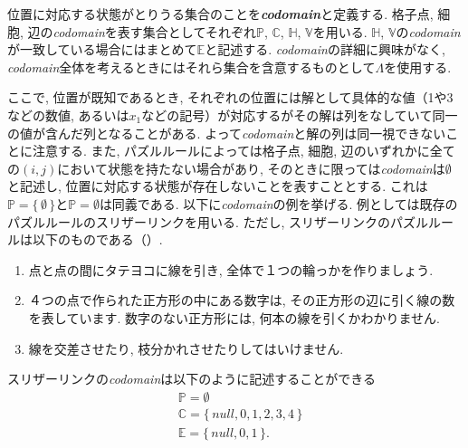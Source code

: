 \begin{definition}\label{definition:Codomain}
  位置に対応する状態がとりうる集合のことを\textbf{\textit{codomain}}と定義する. 格子点, 細胞, 辺の\textit{codomain}を表す集合としてそれぞれ$\mathbb{P}$, $\mathbb{C}$, $\mathbb{H}$, $\mathbb{V}$を用いる. $\mathbb{H}$, $\mathbb{V}$の\textit{codomain}が一致している場合にはまとめて$\mathbb{E}$と記述する. \textit{codomain}の詳細に興味がなく, \textit{codomain}全体を考えるときにはそれら集合を含意するものとして$\Lambda$を使用する.
\end{definition}

ここで, 位置が既知であるとき, それぞれの位置には解として具体的な値（1や3などの数値, あるいは$x_1$などの記号）が対応するがその解は列をなしていて同一の値が含んだ列となることがある.
よって\textit{codomain}と解の列は同一視できないことに注意する. また, パズルルールによっては格子点, 細胞, 辺のいずれかに全ての$(i,j)$において状態を持たない場合があり, そのときに限っては\textit{codomain}は$\emptyset$と記述し, 位置に対応する状態が存在しないことを表すこととする. これは$\mathbb{P}=\{\,\emptyset\,\}$と$\mathbb{P}=\emptyset$は同義である. 以下に\textit{codomain}の例を挙げる. 例としては既存のパズルルールのスリザーリンクを用いる. ただし, スリザーリンクのパズルルールは以下のものである（\cite{web:SlitherLink}）.
\begin{example}[スリザーリンクのパズルルール]\label{example:SlitherLinkRule}\textup{}
  \begin{enumerate}
    \item 点と点の間にタテヨコに線を引き, 全体で１つの輪っかを作りましょう.\label{SlitherLinkRule_1}
    \item ４つの点で作られた正方形の中にある数字は, その正方形の辺に引く線の数を表しています. 数字のない正方形には, 何本の線を引くかわかりません.\label{SlitherLinkRule_2}
    \item 線を交差させたり, 枝分かれさせたりしてはいけません.\label{SlitherLinkRule_3}
  \end{enumerate}
\end{example}

\begin{example}\label{example:SlitherLinkCodomain}
  スリザーリンクの\textit{codomain}は以下のように記述することができる
  \begin{align}
     & \mathbb{P}  =  \emptyset                       \\
     & \mathbb{C}  =  \{\,\textit{null},0,1,2,3,4\,\} \\
     & \mathbb{E}  =  \{\,\textit{null},0,1\,\}.
  \end{align}
\end{example}

